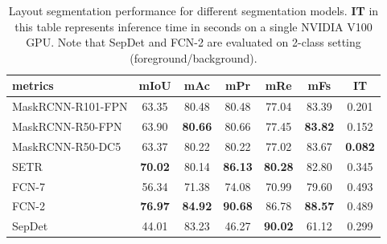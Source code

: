 \documentclass[letterpaper]{article} %
\begin{document}
\begin{table}[h]
\scriptsize
\captionsetup{font=scriptsize}
\begin{tabular}{l|cccccc}
\toprule
\textbf{metrics}  & \textbf{mIoU} & \textbf{mAc} & \textbf{mPr}  & \textbf{mRe}  & \textbf{mFs} & \textbf{IT}\\
\hline
MaskRCNN-R101-FPN 	& 63.35 & 80.48 & 80.48 & 77.04 & 83.39 & 0.201\\ %

MaskRCNN-R50-FPN  	& 63.90 & \textbf{80.66} & 80.66 & 77.45 & \textbf{83.82} & 0.152\\ %

MaskRCNN-R50-DC5     	& 63.37 & 80.22 & 80.22 & 77.02 & 83.67 & \textbf{0.082}\\ %

SETR              	& \textbf{70.02} & 80.14 & \textbf{86.13} & \textbf{80.28} & 82.80 & 0.345 \\

FCN-7 &  56.34 & 71.38 & 74.08  & 70.99 & 79.60 & 0.493\\
\hline
\hline
FCN-2    &  \textbf{76.97}   & \textbf{84.92}  & \textbf{90.68}  & 86.78   & \textbf{88.57} & 0.489  \\
SepDet          & 44.01 & 83.23 &  46.27  &  \textbf{90.02}  &   61.12  & 0.299\\
\bottomrule
\end{tabular}
\caption{Layout segmentation performance for different segmentation models. \textbf{IT} in this table represents inference time in seconds on a single NVIDIA V100 GPU. Note that SepDet and FCN-2 are evaluated on 2-class setting (foreground/background).}
\label{table:layoutmetric_7c}
\end{table}

\end{document}
